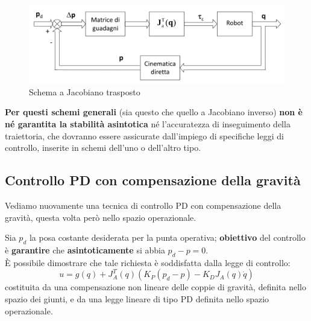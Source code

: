 \begin{figure}[H]
	\centering
	\includegraphics[width=0.7\linewidth]{images/operational_space_control_jac_trasp}
	\caption{Schema a Jacobiano trasposto}
	\label{fig:operationalspacecontroljactrasp}
\end{figure}


\textbf{Per questi schemi generali} (sia questo che quello a Jacobiano inverso) \textbf{non è né garantita la stabilità asintotica} né l’accuratezza di inseguimento della traiettoria, che dovranno essere assicurate dall’impiego di specifiche leggi di controllo, inserite in schemi dell’uno o dell’altro tipo.






\subsection{Controllo PD con compensazione della gravità}\label{section:pd_control_gravity_comp_join_space}
Vediamo nuovamente una tecnica di controllo PD con compensazione della gravità, questa volta però nello spazio operazionale.

Sia $p_d$ la posa costante desiderata per la punta operativa; \textbf{obiettivo} del controllo è \textbf{garantire} che \textbf{asintoticamente} si abbia $p_d - p = 0$.\\
È possibile dimostrare che tale richiesta è soddisfatta dalla legge di controllo:
\begin{equation}\label{eq:pd_gravity_comp_control_operational}
u = g(q) + J_A^T(q)(K_P(p_d - p) - K_DJ_A(q)\dot{q})
\end{equation}
costituita da una compensazione non lineare delle coppie di gravità, definita nello spazio dei giunti, e da una legge lineare di tipo PD definita nello spazio operazionale.

\vspace{5pt}
